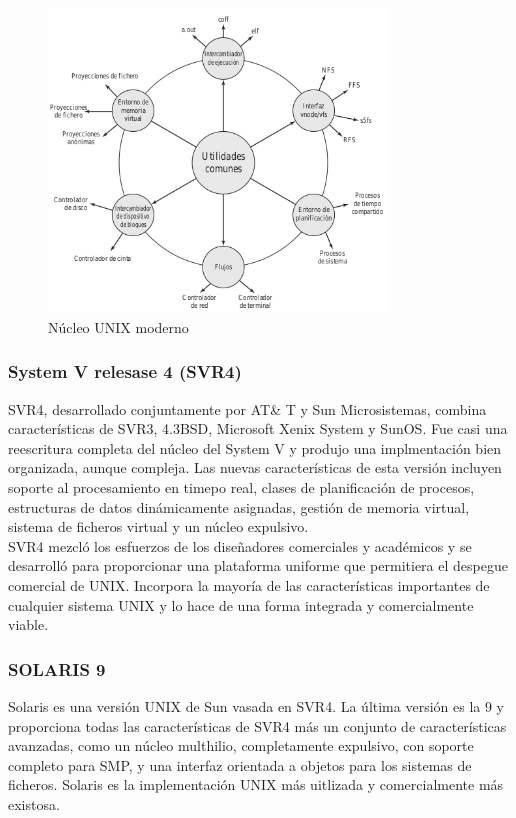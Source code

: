 \documentclass{article}
\begin{document}
			\begin{figure}
			\caption{Núcleo UNIX moderno}
			\label{figura25:nucleomoderno}
			\centering
			\includegraphics[width=0.8\textwidth, scale=1]{figura25.png}
			\end{figure}
			
			\subsubsection{System V relesase 4 (SVR4)}
				SVR4, desarrollado conjuntamente por AT\& T y Sun Microsistemas, combina características de SVR3, 4.3BSD, Microsoft Xenix System y SunOS. Fue casi una reescritura completa del núcleo del System V y produjo una implmentación bien organizada, aunque compleja. Las nuevas características de esta versión incluyen soporte al procesamiento en timepo real, clases de planificación de procesos, estructuras de datos dinámicamente asignadas, gestión de memoria virtual, sistema de ficheros virtual y un núcleo expulsivo. \\
				
				SVR4 mezcló los esfuerzos de los diseñadores comerciales y académicos y se desarrolló para proporcionar una plataforma uniforme que permitiera el despegue comercial de UNIX. Incorpora la mayoría de las características importantes de cualquier sistema UNIX y lo hace de una forma integrada y comercialmente viable.
				
			\subsubsection{SOLARIS 9}
				Solaris es una versión UNIX de Sun vasada en SVR4. La última versión es la 9 y proporciona todas las características de SVR4 más un conjunto de características avanzadas, como un núcleo multhilio, completamente expulsivo, con soporte completo para SMP, y una interfaz orientada a objetos para los sistemas de ficheros. Solaris es la implementación UNIX más uitlizada y comercialmente más existosa. 
			
\end{document}
